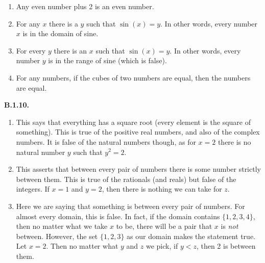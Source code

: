 \documentclass[10pt,]{book}
\theoremstyle{plain}
\theoremstyle{definition}
\theoremstyle{definition}
\theoremstyle{definition}
\theoremstyle{definition}
\numberwithin{equation}{chapter}
\newcommand{\lt}{<}
\begin{document}
\begin{enumerate}[label=(\alph*)]
\item\hypertarget{li-395}{}\hypertarget{p-1532}{}%
Any even number plus 2 is an even number.%
\item\hypertarget{li-396}{}\hypertarget{p-1533}{}%
For any \(x\) there is a \(y\) such that \(\sin(x) = y\). In other words, every number \(x\) is in the domain of sine.%
\item\hypertarget{li-397}{}\hypertarget{p-1534}{}%
For every \(y\) there is an \(x\) such that \(\sin(x) = y\). In other words, every number \(y\) is in the range of sine (which is false).%
\item\hypertarget{li-398}{}\hypertarget{p-1535}{}%
For any numbers, if the cubes of two numbers are equal, then the numbers are equal.%
\end{enumerate}
%
\par\smallskip
\noindent\textbf{B.1.10.} \hypertarget{p-1539}{}%
\leavevmode%
\begin{enumerate}[label=(\alph*)]
\item\hypertarget{li-402}{}\hypertarget{p-1540}{}%
This says that everything has a square root (every element is the square of something). This is true of the positive real numbers, and also of the complex numbers. It is false of the natural numbers though, as for \(x = 2\) there is no natural number \(y\) such that \(y^2 = 2\).%
\item\hypertarget{li-403}{}\hypertarget{p-1541}{}%
This asserts that between every pair of numbers there is some number strictly between them. This is true of the rationals (and reals) but false of the integers. If \(x = 1\) and \(y = 2\), then there is nothing we can take for \(z\).%
\item\hypertarget{li-404}{}\hypertarget{p-1542}{}%
Here we are saying that something is between every pair of numbers. For almost every domain, this is false. In fact, if the domain contains \(\{1,2,3, 4\}\), then no matter what we take \(x\) to be, there will be a pair that \(x\) is \emph{not} between. However, the set \(\{1,2,3\}\) as our domain makes the statement true. Let \(x = 2\). Then no matter what \(y\) and \(z\) we pick, if \(y \lt  z\), then 2 is between them.%
\end{enumerate}
%
\par\smallskip
\end{document}
